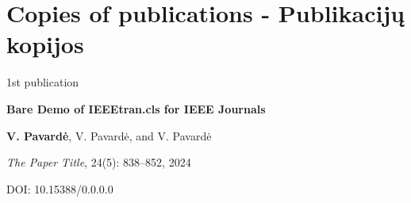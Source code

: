 \chapter*{Copies of publications - Publikacijų kopijos}
\label{cha:publicationscopies} 



\vspace*{15mm}

\begin{center}

{\huge 1st publication}
\vspace{10mm}

{\Large \bf Bare Demo of IEEEtran.cls for IEEE Journals}

\vspace{5mm}
\textbf{V. Pavardė}, V. Pavardė, and V. Pavardė

\vspace{5mm}
\textit{The Paper Title}, 24(5): 838--852, 2024


\vspace{3mm}
DOI: 10.15388/0.0.0.0

\end{center}

\newpage
